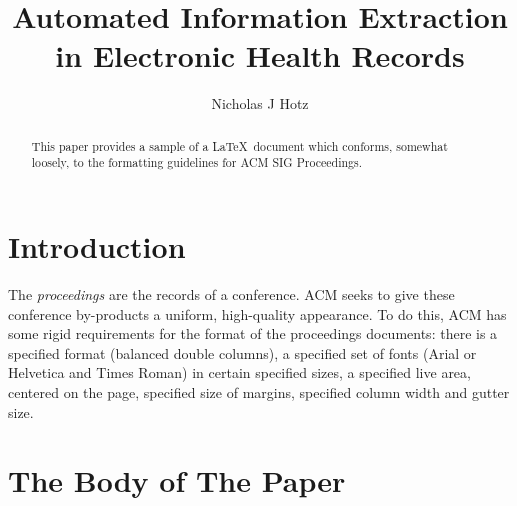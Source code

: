 \documentclass[sigconf]{acmart}
\begin{document}
\title{Automated Information Extraction in Electronic Health Records}

\author{Nicholas J Hotz}

\begin{abstract}
This paper provides a sample of a \LaTeX\ document which conforms,
somewhat loosely, to the formatting guidelines for
ACM SIG Proceedings.
\end{abstract}



\maketitle

\section{Introduction}

The \textit{proceedings} are the records of a
conference. ACM seeks to give these
conference by-products a uniform, high-quality appearance.  To do
this, ACM has some rigid requirements for the format of the
proceedings documents: there is a specified format (balanced double
columns), a specified set of fonts (Arial or Helvetica and Times
Roman) in certain specified sizes, a specified live area, centered on
the page, specified size of margins, specified column width and gutter
size.

\section{The Body of The Paper}
\end{document}
